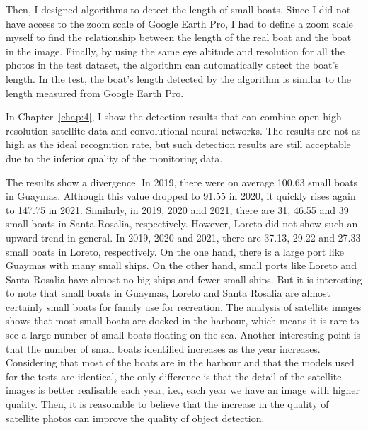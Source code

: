 Then, I designed algorithms to detect the length of small boats. Since I did not have access to the zoom scale of Google Earth Pro, I had to define a zoom scale myself to find the relationship between the length of the real boat and the boat in the image. Finally, by using the same eye altitude and resolution for all the photos in the test dataset, the algorithm can automatically detect the boat's length. In the test, the boat's length detected by the algorithm is similar to the length measured from Google Earth Pro.

In Chapter~\ref{chap:4}, I show the detection results that can combine open high-resolution satellite data and convolutional neural networks. The results are not as high as the ideal recognition rate, but such detection results are still acceptable due to the inferior quality of the monitoring data. 

The results show a divergence. In 2019, there were on average 100.63 small boats in Guaymas. Although this value dropped to 91.55 in 2020, it quickly rises again to 147.75 in 2021. Similarly, in 2019, 2020 and 2021, there are 31, 46.55 and 39 small boats in Santa Rosalia, respectively. However, Loreto did not show such an upward trend in general. In 2019, 2020 and 2021, there are 37.13, 29.22 and 27.33 small boats in Loreto, respectively. On the one hand, there is a large port like Guaymas with many small ships. On the other hand, small ports like Loreto and Santa Rosalia have almost no big ships and fewer small ships. But it is interesting to note that small boats in Guaymas, Loreto and Santa Rosalia are almost certainly small boats for family use for recreation. The analysis of satellite images shows that most small boats are docked in the harbour, which means it is rare to see a large number of small boats floating on the sea. Another interesting point is that the number of small boats identified increases as the year increases. Considering that most of the boats are in the harbour and that the models used for the tests are identical, the only difference is that the detail of the satellite images is better realisable each year, i.e., each year we have an image with higher quality. Then, it is reasonable to believe that the increase in the quality of satellite photos can improve the quality of object detection.



 
